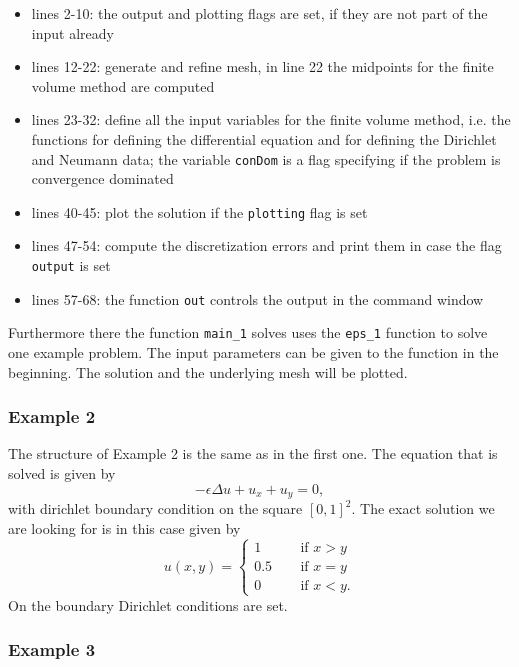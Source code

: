 \begin{itemize}
 \item lines 2-10: the output and plotting flags are set, if they are not part of the input already
 \item lines 12-22: generate and refine mesh, in line 22 the midpoints for the finite volume method are computed
 \item lines 23-32: define all the input variables for the finite volume method, i.e. the functions for defining the differential equation and for defining the Dirichlet and Neumann data; the variable \texttt{conDom} is a flag specifying if the problem is convergence dominated
 \item lines 40-45: plot the solution if the \texttt{plotting} flag is set
 \item lines 47-54: compute the discretization errors and print them in case the flag \texttt{output} is set
 \item lines 57-68: the function \texttt{out} controls the output in the command window
\end{itemize}

Furthermore there the function \texttt{main\_1} solves uses the \texttt{eps\_1} function to solve one example problem. The input parameters can be given to the function in the beginning. The solution and the underlying mesh will be plotted.

\subsubsection{Example 2}

The structure of Example 2 is the same as in the first one. The equation that is solved is given by
\begin{equation}
 -\epsilon\Delta u + u_x + u_y= 0,
\end{equation}
with dirichlet boundary condition on the square $[0,1]^2$. The exact solution we are looking for is in this case given by
\begin{equation}
 u(x,y)=
 \begin{cases}
  1 \qquad 	&\text{if $x>y$}\\
  0.5		&\text{if $x=y$}\\
  0		&\text{if $x<y$}.
 \end{cases}
\end{equation}
On the boundary Dirichlet conditions are set.

\subsubsection{Example 3}

